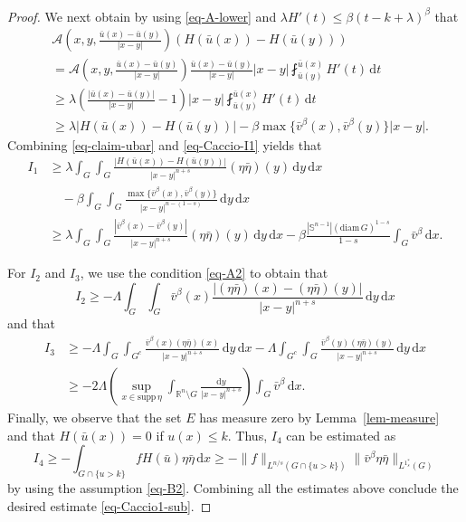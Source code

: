 \documentclass{amsart}
\theoremstyle{plain}
\theoremstyle{definition}
\numberwithin{equation}{section}
\begin{document}
\begin{proof}
We next obtain by using \eqref{eq-A-lower} and $\lambda H'(t) \leq \beta (t-k+\lambda)^\beta$ that
\begin{equation}\label{eq-Caccio-I1}
\begin{split}
&\mathscr{A} \left( x, y, \frac{\bar{u}(x)-\bar{u}(y)}{|x-y|} \right) (H(\bar{u}(x)) - H(\bar{u}(y))) \\
&= \mathscr{A} \left( x, y, \frac{\bar{u}(x)-\bar{u}(y)}{|x-y|} \right) \frac{\bar{u}(x)-\bar{u}(y)}{|x-y|} |x-y| \fint_{\bar{u}(y)}^{\bar{u}(x)} H'(t) \,\mathrm{d}t \\
&\geq \lambda \left( \frac{|\bar{u}(x)-\bar{u}(y)|}{|x-y|} - 1 \right) |x-y| \fint_{\bar{u}(y)}^{\bar{u}(x)} H'(t) \,\mathrm{d}t \\
&\geq \lambda |H(\bar{u}(x)) - H(\bar{u}(y))| - \beta \max\{ \bar{v}^\beta(x), \bar{v}^\beta(y) \} |x-y|.
\end{split}
\end{equation}
Combining \eqref{eq-claim-ubar} and \eqref{eq-Caccio-I1} yields that
\begin{align*}
I_1
&\geq \lambda \int_{G} \int_{G} \frac{|H(\bar{u}(x))-H(\bar{u}(y))|}{|x-y|^{n+s}} (\eta\bar{\eta})(y) \,\mathrm{d}y \,\mathrm{d}x \\
&\quad - \beta \int_{G} \int_{G} \frac{\max\{ \bar{v}^\beta(x), \bar{v}^\beta(y) \}}{|x-y|^{n-(1-s)}} \,\mathrm{d}y \,\mathrm{d}x \\
&\geq \lambda \int_{G} \int_{G} \frac{|\bar{v}^\beta(x)-\bar{v}^\beta(y)|}{|x-y|^{n+s}} (\eta\bar{\eta})(y) \,\mathrm{d}y \,\mathrm{d}x - \beta \frac{|\mathbb{S}^{n-1}|(\mathrm{diam}\, G)^{1-s}}{1-s} \int_{G} \bar{v}^\beta \,\mathrm{d}x.
\end{align*}

For $I_2$ and $I_3$, we use the condition \eqref{eq-A2} to obtain that
\begin{equation*}
I_2
\geq - \Lambda \int_{G} \int_{G} \bar{v}^\beta(x) \frac{|(\eta\bar{\eta})(x)-(\eta\bar{\eta})(y)|}{|x-y|^{n+s}} \,\mathrm{d}y \,\mathrm{d}x
\end{equation*}
and that
\begin{align*}
I_3
&\geq -\Lambda \int_{G} \int_{G^c} \frac{\bar{v}^\beta(x) (\eta\bar{\eta})(x)}{|x-y|^{n+s}} \,\mathrm{d}y\,\mathrm{d}x - \Lambda \int_{G^c} \int_{G} \frac{\bar{v}^\beta(y) (\eta\bar{\eta})(y)}{|x-y|^{n+s}} \,\mathrm{d}y \,\mathrm{d}x \\
&\geq -2\Lambda \left( \sup_{x \in \mathrm{supp}\,\eta} \int_{\mathbb{R}^n \setminus G} \frac{\mathrm{d}y}{|x-y|^{n+s}} \right) \int_{G} \bar{v}^\beta \,\mathrm{d}x.
\end{align*}
Finally, we observe that the set $E$ has measure zero by Lemma~\ref{lem-measure} and that $H(\bar{u}(x))=0$ if $u(x) \leq k$. Thus, $I_4$ can be estimated as
\begin{equation*}
I_4 \geq - \int_{G \cap \{u>k\}} fH(\bar{u}) \eta \bar{\eta} \,\mathrm{d}x \geq - \|f\|_{L^{n/s}(G \cap \{u>k\})} \|\bar{v}^\beta \eta\bar{\eta}\|_{L^{1^{\ast}_s}(G)}
\end{equation*}
by using the assumption \eqref{eq-B2}. Combining all the estimates above conclude the desired estimate \eqref{eq-Caccio1-sub}.


\end{proof}
\end{document}
